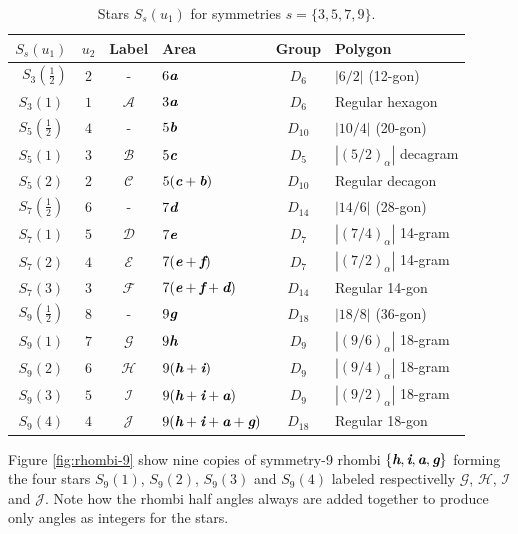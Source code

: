 \documentclass[11pt]{article}
\def\mathbi#1{\textbf{\em #1}}
\begin{document}
\begin{table}[H]
\begin{center}
\begin{tabular}{|c|c|c|l|c|l|}
\hline
$S_s(u_1)$ & $u_2$ & Label & Area & Group & Polygon \\ \hline\
$S_3(\frac{1}2)$ & $2$ & -     & $6\mathbi{a}$ & $D_6$ & $|6/2|$ (12-gon) \\[0.5ex]
$S_3(1)$         & $1$ & $\mathcal{A}$ & $3\mathbi{a}$ & $D_6$ & Regular hexagon \\[0.5ex]
\hline
$S_5(\frac{1}2)$ & $4$ & -      & $5\mathbi{b}$ & $D_{10}$ & $|10/4|$ (20-gon)\\[0.5ex]
$S_5(1)$ & $3$ & $\mathcal{B}$ & $5\mathbi{c}$ & $D_5$ & $|(5/2)_\alpha|$ decagram\\[0.5ex]
$S_5(2)$ & $2$ & $\mathcal{C}$ & $5(\mathbi{c}+\mathbi{b})$ & $D_{10}$ & Regular decagon\\[0.5ex]
\hline
$S_7(\frac{1}2)$ & $6$ & -     & $7\mathbi{d}$ & $D_{14}$ & $|14/6|$ (28-gon)\\[0.5ex]
$S_7(1)$ & $5$ & $\mathcal{D}$ & $7\mathbi{e}$ & $D_7$ & $|(7/4)_\alpha|$ 14-gram\\[0.5ex]
$S_7(2)$ & $4$ & $\mathcal{E}$ & $7(\mathbi{e}+\mathbi{f})$ & $D_7$ & $|(7/2)_\alpha|$ 14-gram\\[0.5ex]
$S_7(3)$ & $3$ & $\mathcal{F}$ & $7(\mathbi{e}+\mathbi{f}+\mathbi{d})$ & $D_{14}$ & Regular 14-gon\\[0.5ex]
\hline
$S_9(\frac{1}2)$ & $8$ & -     & $9\mathbi{g}$ & $D_{18}$ & $|18/8|$ (36-gon)\\[0.5ex]
$S_9(1)$ & $7$ & $\mathcal{G}$ & $9\mathbi{h}$ & $D_9$ & $|(9/6)_\alpha|$ 18-gram\\[0.5ex]
$S_9(2)$ & $6$ & $\mathcal{H}$ & $9(\mathbi{h}+\mathbi{i})$ & $D_9$ & $|(9/4)_\alpha|$ 18-gram\\[0.5ex]
$S_9(3)$ & $5$ & $\mathcal{I}$ & $9(\mathbi{h}+\mathbi{i}+\mathbi{a})$ & $D_9$ & $|(9/2)_\alpha|$ 18-gram\\[0.5ex]
$S_9(4)$ & $4$ & $\mathcal{J}$ & $9(\mathbi{h}+\mathbi{i}+\mathbi{a}+\mathbi{g})$ & $D_{18}$ & Regular 18-gon\\[0.5ex]
\hline
\end{tabular}
\caption{Stars $S_s(u_1)$ for symmetries $s = \{3,5,7,9\}$.}
\label{tbl:stars}
\end{center}
\end{table}

Figure \ref{fig:rhombi-9} show nine copies of symmetry-9 rhombi $\{\mathbi{h},\mathbi{i},\mathbi{a},\mathbi{g}\}$ forming the four stars $S_9(1)$, $S_9(2)$, $S_9(3)$ and $S_9(4)$ labeled respectivelly $\mathcal{G}$, $\mathcal{H}$, $\mathcal{I}$ and $\mathcal{J}$. Note how the rhombi half angles always are added together to produce only angles as integers for the stars.
\end{document}
